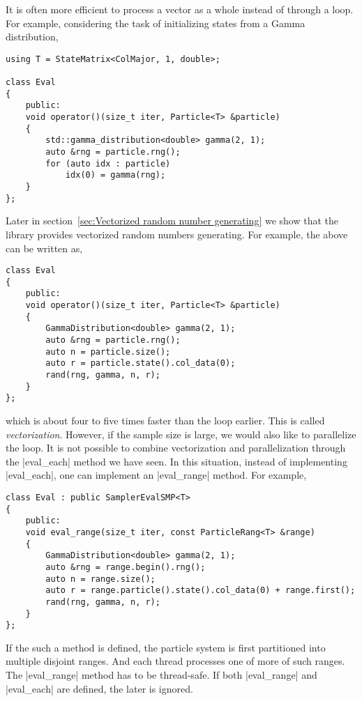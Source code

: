 It is often more efficient to process a vector as a whole instead of through a
loop. For example, considering the task of initializing states from a Gamma
distribution,
\begin{verbatim}
using T = StateMatrix<ColMajor, 1, double>;

class Eval
{
    public:
    void operator()(size_t iter, Particle<T> &particle)
    {
        std::gamma_distribution<double> gamma(2, 1);
        auto &rng = particle.rng();
        for (auto idx : particle)
            idx(0) = gamma(rng);
    }
};
\end{verbatim}
Later in section~\ref{sec:Vectorized random number generating} we show that the
library provides vectorized random numbers generating. For example, the above
can be written as,
\begin{verbatim}
class Eval
{
    public:
    void operator()(size_t iter, Particle<T> &particle)
    {
        GammaDistribution<double> gamma(2, 1);
        auto &rng = particle.rng();
        auto n = particle.size();
        auto r = particle.state().col_data(0);
        rand(rng, gamma, n, r);
    }
};
\end{verbatim}
which is about four to five times faster than the loop earlier. This is called
\emph{vectorization}. However, if the sample size is large, we would also like
to parallelize the loop. It is not possible to combine vectorization and
parallelization through the |eval_each| method we have seen. In this situation,
instead of implementing |eval_each|, one can implement an |eval_range| method.
For example,
\begin{verbatim}
class Eval : public SamplerEvalSMP<T>
{
    public:
    void eval_range(size_t iter, const ParticleRang<T> &range)
    {
        GammaDistribution<double> gamma(2, 1);
        auto &rng = range.begin().rng();
        auto n = range.size();
        auto r = range.particle().state().col_data(0) + range.first();
        rand(rng, gamma, n, r);
    }
};
\end{verbatim}
If the such a method is defined, the particle system is first partitioned into
multiple disjoint ranges. And each thread processes one of more of such ranges.
The |eval_range| method has to be thread-safe. If both |eval_range| and
|eval_each| are defined, the later is ignored.

